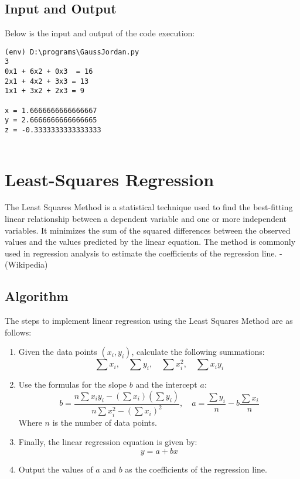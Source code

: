 \documentclass[12pt]{article}
\begin{document}
    \subsection*{Input and Output}
    
    Below is the input and output of the code execution:
    {\small
    \begin{verbatim}
(env) D:\programs\GaussJordan.py
3
0x1 + 6x2 + 0x3  = 16
2x1 + 4x2 + 3x3 = 13
1x1 + 3x2 + 2x3 = 9

x = 1.6666666666666667
y = 2.6666666666666665
z = -0.3333333333333333
        
    \end{verbatim}
    }


    
    \newpage
    \section*{Least-Squares Regression}

    The Least Squares Method is a statistical technique used to find the best-fitting linear relationship between a dependent variable and one or more independent variables. It minimizes the sum of the squared differences between the observed values and the values predicted by the linear equation. The method is commonly used in regression analysis to estimate the coefficients of the regression line. -(Wikipedia)
        
        \subsection*{Algorithm}
        The steps to implement linear regression using the Least Squares Method are as follows:
        
        \begin{enumerate}
            \item Given the data points \( (x_i, y_i) \), calculate the following summations:
            \[
                \sum x_i, \quad \sum y_i, \quad \sum x_i^2, \quad \sum x_iy_i
                \]
                \item Use the formulas for the slope \( b \) and the intercept \( a \):
                \[
                    b = \frac{n \sum x_iy_i - (\sum x_i)(\sum y_i)}{n \sum x_i^2 - (\sum x_i)^2}, \quad a = \frac{\sum y_i}{n} - b \frac{\sum x_i}{n}
                    \]
                    Where \( n \) is the number of data points.
                    \item Finally, the linear regression equation is given by:
                    \[
                        y = a + bx
                        \]
                        \item Output the values of \( a \) and \( b \) as the coefficients of the regression line.
                    \end{enumerate}
                    
\end{document}
